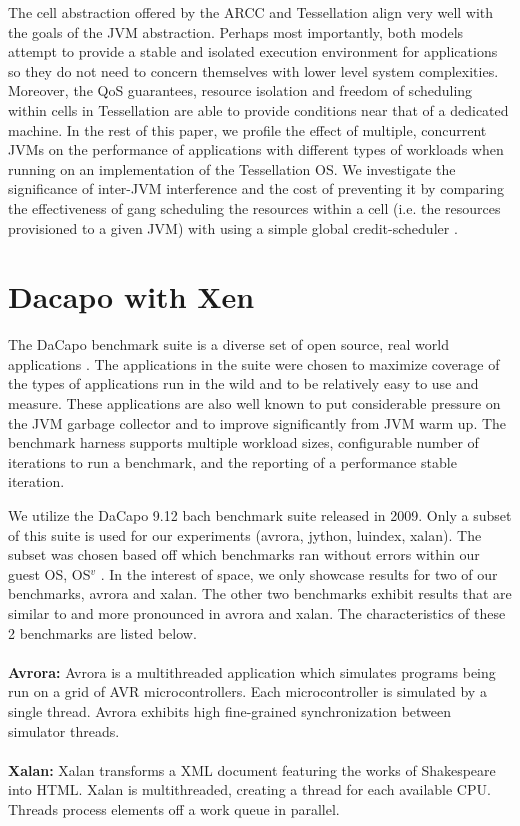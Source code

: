 \documentclass{sig-alternate}
\begin{document}
The cell abstraction offered by the ARCC and Tessellation align very well with the goals of the JVM abstraction. Perhaps most importantly, both models attempt to provide a stable and isolated execution environment for applications so they do not need to concern themselves with lower level system complexities. Moreover, the QoS guarantees, resource isolation and freedom of scheduling within cells in Tessellation are able to provide conditions near that of a dedicated machine. In the rest of this paper, we profile the effect of multiple, concurrent JVMs on the performance of applications with different types of workloads when running on an implementation of the Tessellation OS. We investigate the significance of inter-JVM interference and the cost of preventing it by comparing the effectiveness of gang scheduling the resources within a cell (i.e. the resources provisioned to a given JVM) with using a simple global credit-scheduler \cite{ackaouy2006xen}.

\section{Dacapo with Xen} \label{sec:dacapo}
The DaCapo benchmark suite is a diverse set of open source, real world applications \cite{blackburn2006dacapo}. The applications in the suite were chosen to maximize coverage of the types of applications run in the wild and to be relatively easy to use and measure. These applications are also well known to put considerable pressure on the JVM garbage collector and to improve significantly from JVM warm up. The benchmark harness supports multiple workload sizes, configurable number of iterations to run a benchmark, and the reporting of a performance stable iteration.

We utilize the DaCapo 9.12 bach benchmark suite released in 2009. Only a subset of this suite is used for our experiments (avrora, jython, luindex, xalan). The subset was chosen based off which benchmarks ran without errors within our guest OS, OS$^{v}$ \cite{aviOSv2014}. In the interest of space, we only showcase results for two of our benchmarks, avrora and xalan. The other two benchmarks exhibit results that are similar to and more pronounced in avrora and xalan. The characteristics of these 2 benchmarks are listed below.
\\\\
\textbf{Avrora:} Avrora is a multithreaded application which simulates programs being run on a grid of AVR microcontrollers. Each microcontroller is simulated by a single thread. Avrora exhibits high fine-grained synchronization between simulator threads.
\\\\
\textbf{Xalan:} Xalan transforms a XML document featuring the works of Shakespeare into HTML. Xalan is multithreaded, creating a thread for each available CPU. Threads process elements off a work queue in parallel.
\end{document}
